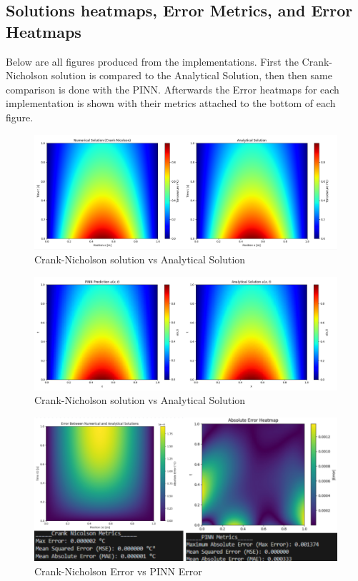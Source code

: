 \documentclass[12pt, reqno]{amsart}
\begin{document}
\subsection{Solutions heatmaps, Error Metrics, and Error Heatmaps}
Below are all figures produced from the implementations. First the Crank-Nicholson solution is compared to the Analytical Solution, then then same comparison is done with the PINN. Afterwards the Error heatmaps for each implementation is shown with their metrics attached to the bottom of each figure.
\newpage
\begin{figure}
\captionsetup{labelformat = empty}
    \caption{Crank-Nicholson solution vs Analytical Solution}
    \centering
    \includegraphics[width=.9\linewidth]{CRANK NICOLSON FINAL.png}
\end{figure}
\begin{figure}
\captionsetup{labelformat = empty}
    \caption{Crank-Nicholson solution vs Analytical Solution}
    \centering
    \includegraphics[width=.9\linewidth]{PINN GRAPH FINAL.png}
\end{figure}
\begin{figure}
\captionsetup{labelformat = empty}
    \caption{Crank-Nicholson Error vs PINN Error}
    \centering
    \includegraphics[width=.9\linewidth]{ERROR MAPS.png}
\end{figure}
\clearpage
\end{document}
